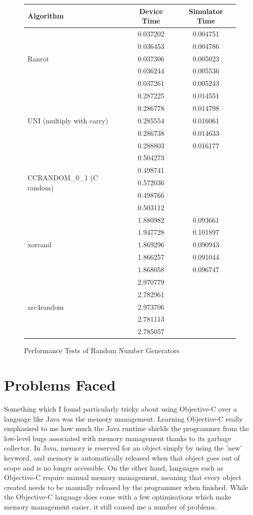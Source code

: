 \documentclass[a4paper,oneside]{report}
\begin{document}
	
\begin{figure}[h!]
  \centering	
	\begin{tabular}{|l|c|c|}
\hline
Algorithm & Device Time & Simulator Time \\ \hline
\multirow{5}{*}{Ranrot} & 0.037202 & 0.004751 \\
 & 0.036453 & 0.004786 \\
 & 0.037306 & 0.005023 \\
 & 0.036244 & 0.005536 \\ 
 & 0.037261 & 0.005243 \\ \hline
\multirow{5}{*}{UNI (multiply with carry)} & 0.287225 & 0.014551 \\
 & 0.286778 & 0.014798 \\
 & 0.285554 & 0.016061 \\
 & 0.286738 & 0.014633 \\
 & 0.288803 & 0.016177 \\ \hline
\multirow{5}{*}{CCRANDOM\_0\_1 (C random)} & 0.504273 &  \\
 & 0.498741 &  \\
 & 0.572036 &  \\
 & 0.498766 &  \\
 & 0.503112 &  \\ \hline
\multirow{5}{*}{xorrand} & 1.880982 & 0.093661 \\
 & 1.947728 & 0.101897 \\
 & 1.869296 & 0.090943 \\
 & 1.866257 & 0.091044 \\
 & 1.868058 & 0.096747 \\ \hline
\multirow{5}{*}{arc4random} & 2.970779 &  \\
 & 2.782961 &  \\
 & 2.973706 &  \\
 & 2.781113 &  \\
 & 2.785057 &  \\ \hline
\end{tabular}    \caption{Performance Tests of Random Number Generators}
\end{figure}
		
\section{Problems Faced} 

Something which I found particularly tricky about using Objective-C over a language like Java was the memory management. Learning Objective-C really emphasised to me how much the Java runtime shields the programmer from the low-level bugs associated with memory management thanks to its garbage collector. In Java, memory is reserved for an object simply by using the 'new' keyword, and memory is automatically released when that object goes out of scope and is no longer accessible. On the other hand, languages such as Objective-C  require manual memory management, meaning that every object created needs to be manually released by the programmer when finished. While the Objective-C language does come with a few optimisations which make memory management easier, it still caused me a number of problems. 
\end{document}
